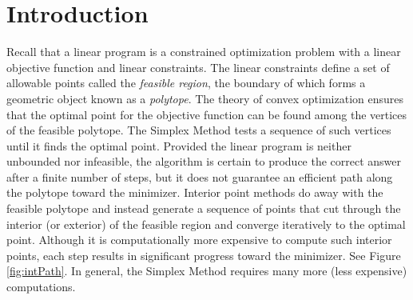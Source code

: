 
\def\Mu{\boldsymbol{\mu}}
\def\Lamb{\boldsymbol{\lambda}}


\section*{Introduction}

Recall that a linear program is a constrained optimization problem with a linear objective function and linear constraints.
The linear constraints define a set of allowable points called the \emph{feasible region}, the boundary of which forms a geometric object known as a \emph{polytope}.
The theory of convex optimization ensures that the optimal point for the objective function can be found among the vertices of the feasible polytope. The Simplex Method tests a sequence of such vertices until it finds
the optimal point.
Provided the linear program is neither unbounded nor infeasible, the algorithm is certain to produce the correct answer after a finite number of steps, but it does not guarantee an efficient path along the polytope toward the minimizer.
Interior point methods do away with the feasible polytope and instead generate a sequence of points that cut through the interior (or exterior) of the feasible region and converge iteratively to the optimal point.
Although it is computationally more expensive to compute such interior points, each step results in significant progress toward the minimizer.
See Figure \ref{fig:intPath}.
In general, the Simplex Method requires many more (less expensive) computations.

